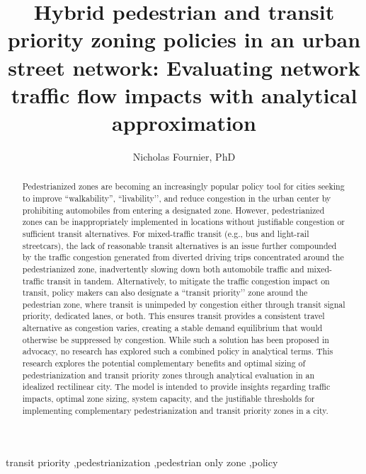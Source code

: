 \documentclass{elsarticle}\usepackage[]{graphicx}\usepackage[]{color}
\begin{document}
\begin{frontmatter}


\title{Hybrid pedestrian and transit priority zoning policies in an urban street network: Evaluating network traffic flow impacts with analytical approximation}
 
\author{Nicholas Fournier, PhD}
\address{Institute of Transportation Studies, \\
University of California, Berkeley\\
409 McLaughlin Hall, Berkeley, California 94720}


\begin{keyword}
transit priority \sep pedestrianization \sep pedestrian only zone \sep policy 
\end{keyword}


\begin{abstract}
Pedestrianized zones are becoming an increasingly popular policy tool for cities seeking to improve ``walkability'', ``livability’’, and reduce congestion in the urban center by prohibiting automobiles from entering a designated zone. However, pedestrianized zones can be inappropriately implemented in locations without justifiable congestion or sufficient transit alternatives. For mixed-traffic transit (e.g., bus and light-rail streetcars), the lack of reasonable transit alternatives is an issue further compounded by the traffic congestion generated from diverted driving trips concentrated around the pedestrianized zone, inadvertently slowing down both automobile traffic and mixed-traffic transit in tandem. Alternatively, to mitigate the traffic congestion impact on transit, policy makers can also designate a ``transit priority’’ zone around the pedestrian zone, where transit is unimpeded by congestion either through transit signal priority, dedicated lanes, or both. This ensures transit provides a consistent travel alternative as congestion varies, creating a stable demand equilibrium that would otherwise be suppressed by congestion. While such a solution has been proposed in advocacy, no research has explored such a combined policy in analytical terms. This research explores the potential complementary benefits and optimal sizing of pedestrianization and transit priority zones through analytical evaluation in an idealized rectilinear city. The model is intended to provide insights regarding traffic impacts, optimal zone sizing, system capacity, and the justifiable thresholds for implementing complementary pedestrianization and transit priority zones in a city.


\end{abstract}

\end{frontmatter}
\end{document}
